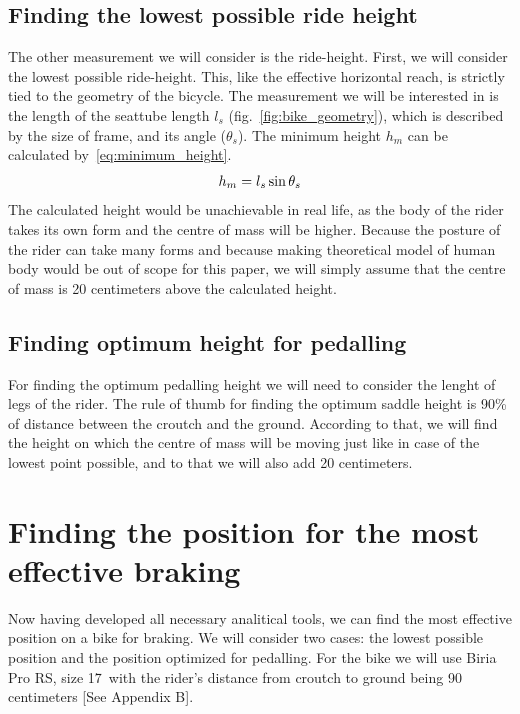 \documentclass[12pt, a4]{article}
\begin{document}
\subsection{Finding the lowest possible ride height}\label{geometry_lowest_pos}
The other measurement we will consider is the ride-height. First, we will consider the lowest possible ride-height.
This, like the effective horizontal reach, is strictly tied to the geometry of the bicycle. The measurement we will
be interested in is the length of the seattube length $l_s$ (fig.~\ref{fig:bike_geometry}), which is described by the size of frame, and its angle ($\theta_s$).
The minimum height $h_m$ can be calculated by~\eqref{eq:minimum_height}.
\begin{equation}
\centering%
\label{eq:minimum_height}
h_m = l_s\sin\theta_s
\end{equation}
The calculated height would be unachievable in real life, as the body of the rider takes its own form and the centre
of mass will be higher. Because the posture of the rider can take many forms and because making theoretical model 
of human body would be out of scope for this paper, we will simply assume that the centre of mass is 20 
centimeters above the calculated height. %
\subsection{Finding optimum height for pedalling}\label{geometry_pedalling_pos}
For finding the optimum pedalling height we will need to consider the lenght of legs of the rider. The rule of thumb 
for finding the optimum saddle height is 90\% of distance between the croutch and the ground. According to that, we 
will find the height on which the centre of mass will be moving just like in case of the lowest point possible, and 
to that we will also add 20 centimeters.

\section{Finding the position for the most effective braking}\label{effective_braking}
Now having developed all necessary analitical tools, we can find the most effective position on a bike for braking. 
We will consider two cases: the lowest possible position and the position optimized for pedalling.
For the bike we will use Biria Pro RS, size 17\"~with the rider's distance from croutch to ground being
90 centimeters [See Appendix B].
\end{document}
